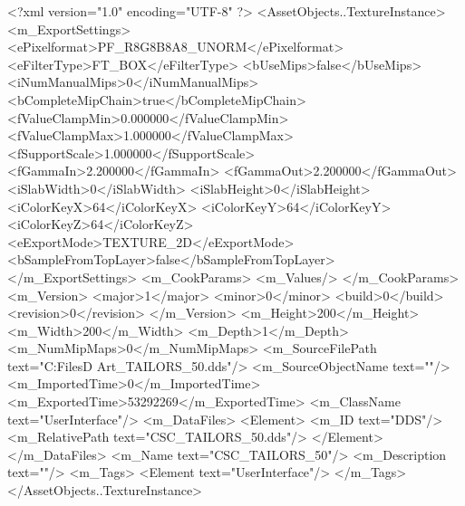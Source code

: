 <?xml version="1.0" encoding="UTF-8" ?>
<AssetObjects..TextureInstance>
	<m_ExportSettings>
		<ePixelformat>PF_R8G8B8A8_UNORM</ePixelformat>
		<eFilterType>FT_BOX</eFilterType>
		<bUseMips>false</bUseMips>
		<iNumManualMips>0</iNumManualMips>
		<bCompleteMipChain>true</bCompleteMipChain>
		<fValueClampMin>0.000000</fValueClampMin>
		<fValueClampMax>1.000000</fValueClampMax>
		<fSupportScale>1.000000</fSupportScale>
		<fGammaIn>2.200000</fGammaIn>
		<fGammaOut>2.200000</fGammaOut>
		<iSlabWidth>0</iSlabWidth>
		<iSlabHeight>0</iSlabHeight>
		<iColorKeyX>64</iColorKeyX>
		<iColorKeyY>64</iColorKeyY>
		<iColorKeyZ>64</iColorKeyZ>
		<eExportMode>TEXTURE_2D</eExportMode>
		<bSampleFromTopLayer>false</bSampleFromTopLayer>
	</m_ExportSettings>
	<m_CookParams>
		<m_Values/>
	</m_CookParams>
	<m_Version>
		<major>1</major>
		<minor>0</minor>
		<build>0</build>
		<revision>0</revision>
	</m_Version>
	<m_Height>200</m_Height>
	<m_Width>200</m_Width>
	<m_Depth>1</m_Depth>
	<m_NumMipMaps>0</m_NumMipMaps>
	<m_SourceFilePath text="C:\Users\Shadow\Desktop\Working Files\2D Art\Quarters\Tailors\CSC_TAILORS_50.dds"/>
	<m_SourceObjectName text=""/>
	<m_ImportedTime>0</m_ImportedTime>
	<m_ExportedTime>53292269</m_ExportedTime>
	<m_ClassName text="UserInterface"/>
	<m_DataFiles>
		<Element>
			<m_ID text="DDS"/>
			<m_RelativePath text="CSC_TAILORS_50.dds"/>
		</Element>
	</m_DataFiles>
	<m_Name text="CSC_TAILORS_50"/>
	<m_Description text=""/>
	<m_Tags>
		<Element text="UserInterface"/>
	</m_Tags>
</AssetObjects..TextureInstance>

